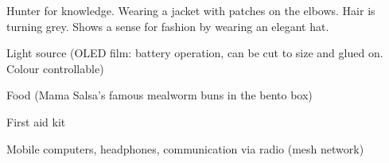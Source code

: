 \begin{npcBox}[title=Books]
    \begin{consequences}
    \item {}
    \item {}
    \item {}
    \end{consequences}
    
    \begin{npcDescription}
    Hunter for knowledge. Wearing a jacket with patches on the elbows. Hair is turning grey. Shows a sense for fashion by wearing an elegant hat.
    \end{npcDescription}


    \begin{equipment}
    \item Light source (OLED film: battery operation, can be cut to size and glued on. Colour controllable)
    \item Food (Mama Salsa's famous mealworm buns in the bento box)
    \item First aid kit
    \item Mobile computers, headphones, communication via radio (mesh network)
    \end{equipment}
    
\end{npcBox}


